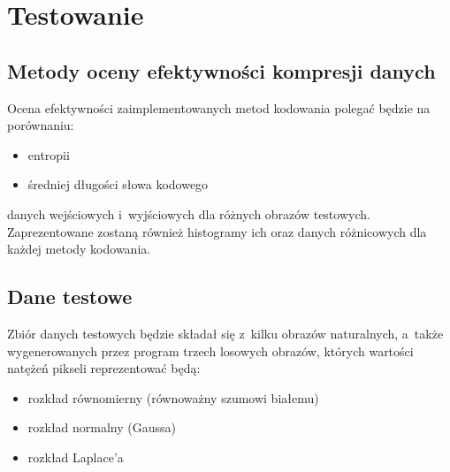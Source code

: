 \section{Testowanie}
\label{sec:testowanie}

\subsection{Metody oceny efektywności kompresji danych}
\label{subsec:metody_oceny_efektywnosci_kompresji_danych}
Ocena efektywności zaimplementowanych metod kodowania polegać będzie na porównaniu:
\begin{itemize} \itemsep1pt
	\item entropii
	\item średniej długości słowa kodowego
\end{itemize}
danych wejściowych i~wyjściowych dla różnych obrazów testowych. Zaprezentowane zostaną również histogramy ich oraz danych różnicowych dla każdej metody kodowania.

\subsection{Dane testowe}
\label{subsec:dane_testowe}

Zbiór danych testowych będzie składał się z~kilku obrazów naturalnych, a~także wygenerowanych przez program trzech losowych obrazów, których wartości natężeń pikseli reprezentować będą:

\begin{itemize} \itemsep1pt
	\item rozkład równomierny (równoważny szumowi białemu)
	\item rozkład normalny (Gaussa)
	\item rozkład Laplace'a
\end{itemize}




